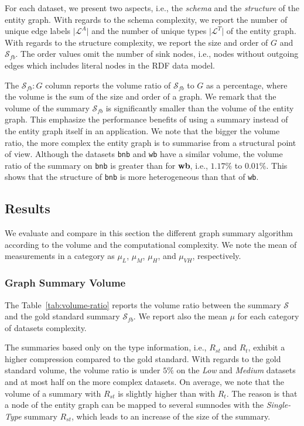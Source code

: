For each dataset, we present two aspects, i.e., the \emph{schema} and the \emph{structure} of the entity graph. With regards to the schema complexity, we report the number of unique edge labels $\vert \mathcal{L}^A \vert$ and the number of unique types $\vert \mathcal{L}^T \vert$ of the entity graph. With regards to the structure complexity, we report the size and order of $G$ and  $\mathcal{S}_{fb}$. The order values omit the number of sink nodes, i.e., nodes without outgoing edges which includes literal nodes in the RDF data model.

The $\mathcal{S}_{fb}:G$ column reports the volume ratio of $\mathcal{S}_{fb}$ to $G$ as a percentage, where the volume is the sum of the size and order of a graph. We remark that the volume of the summary $\mathcal{S}_{fb}$ is significantly smaller than the volume of the entity graph. This emphasize the performance benefits of using a summary instead of the entity graph itself in an application. We note that the bigger the volume ratio, the more complex the entity graph is to summarise from a structural point of view. Although the datasets \texttt{bnb} and \texttt{wb} have a similar volume, the volume ratio of the summary on \texttt{bnb} is greater than for \textbf{wb}, i.e., $1.17\%$ to $0.01\%$. This shows that the structure of \texttt{bnb} is more heterogeneous than that of \texttt{wb}.



\subsection{Results}

We evaluate and compare in this section the different graph summary algorithm according to the volume and the computational complexity.
We note the mean of measurements in a category as $\mu_{L}$, $\mu_{M}$, $\mu_{H}$, and $\mu_{VH}$, respectively.

\subsubsection{Graph Summary Volume}

The Table~\ref{tab:volume-ratio} reports the volume ratio between the summary $\mathcal{S}$ and the gold standard summary $\mathcal{S}_{fb}$. We report also the mean $\mu$ for each category of datasets complexity.

The summaries based only on the type information, i.e., $R_{st}$ and $R_t$, exhibit a higher compression compared to the gold standard. With regards to the gold standard volume, the volume ratio is under $5\%$ on the \emph{Low} and \emph{Medium} datasets and at most half on the more complex datasets. On average, we note that the volume of a summary with $R_{st}$ is slightly higher than with $R_t$. The reason is that a node of the entity graph can be mapped to several sumnodes with the \emph{Single-Type} summary $R_{st}$, which leads to an increase of the size of the summary.

